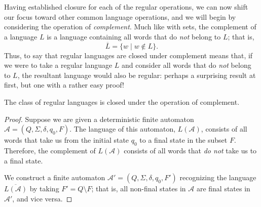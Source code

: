 Having established closure for each of the regular operations, we can now shift our focus toward other common language operations, and we will begin by considering the operation of \emph{complement}. Much like with sets, the complement of a language $L$ is a language containing all words that do \emph{not} belong to $L$; that is,
\begin{equation*}
\overline{L} = \{w \mid w \not\in L\}.
\end{equation*}
Thus, to say that regular languages are closed under complement means that, if we were to take a regular language $L$ and consider all words that do \emph{not} belong to $L$, the resultant language would also be regular: perhaps a surprising result at first, but one with a rather easy proof!

\begin{theorem}\label{thm:FAclosurecomplement}
The class of regular languages is closed under the operation of complement.

\begin{proof}
Suppose we are given a deterministic finite automaton $\mathcal{A} = (Q, \Sigma, \delta, q_{0}, F)$. The language of this automaton, $L(\mathcal{A})$, consists of all words that take us from the initial state $q_{0}$ to a final state in the subset $F$. Therefore, the complement of $L(\mathcal{A})$ consists of all words that \emph{do not} take us to a final state.

We construct a finite automaton $\mathcal{A}' = (Q, \Sigma, \delta, q_{0}, F')$ recognizing the language $\overline{L(\mathcal{A})}$ by taking $F' = Q \setminus F$; that is, all non-final states in $\mathcal{A}$ are final states in $\mathcal{A}'$, and vice versa.
\end{proof}
\end{theorem}

